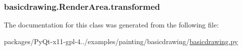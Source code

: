 \subsubsection[{transformed}]{\setlength{\rightskip}{0pt plus 5cm}basicdrawing.\+Render\+Area.\+transformed}\label{classbasicdrawing_1_1RenderArea_ad27e4611f050931113893501b25e741d}


The documentation for this class was generated from the following file\+:\begin{DoxyCompactItemize}
\item 
packages/\+Py\+Qt-\/x11-\/gpl-\/4../examples/painting/basicdrawing/\hyperlink{basicdrawing_8py}{basicdrawing.\+py}\end{DoxyCompactItemize}
